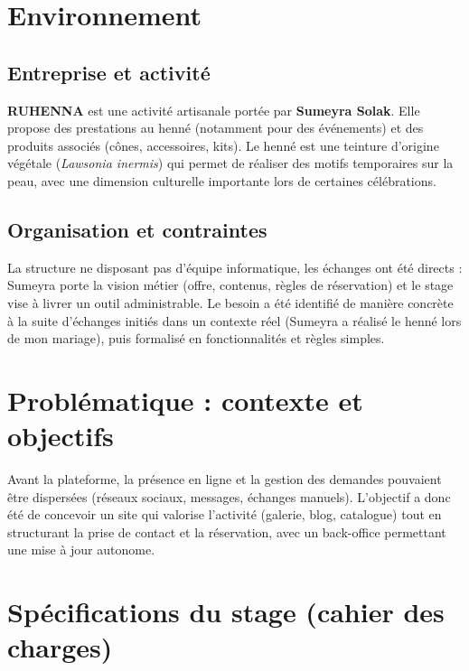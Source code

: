 \section{Environnement}
\subsection{Entreprise et activité}
\textbf{RUHENNA} est une activité artisanale portée par \textbf{Sumeyra Solak}. Elle propose des prestations au henné (notamment pour des événements) et des produits associés (cônes, accessoires, kits). Le henné est une teinture d’origine végétale (\textit{Lawsonia inermis}) qui permet de réaliser des motifs temporaires sur la peau, avec une dimension culturelle importante lors de certaines célébrations.

\subsection{Organisation et contraintes}
La structure ne disposant pas d’équipe informatique, les échanges ont été directs : Sumeyra porte la vision métier (offre, contenus, règles de réservation) et le stage vise à livrer un outil administrable. Le besoin a été identifié de manière concrète à la suite d’échanges initiés dans un contexte réel (Sumeyra a réalisé le henné lors de mon mariage), puis formalisé en fonctionnalités et règles simples.

\section{Problématique : contexte et objectifs}
Avant la plateforme, la présence en ligne et la gestion des demandes pouvaient être dispersées (réseaux sociaux, messages, échanges manuels). L’objectif a donc été de concevoir un site qui valorise l’activité (galerie, blog, catalogue) tout en structurant la prise de contact et la réservation, avec un back-office permettant une mise à jour autonome.

\section{Spécifications du stage (cahier des charges)}

